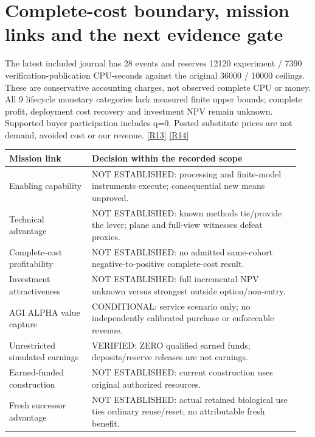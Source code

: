 \documentclass[10pt,letterpaper]{article}
\begin{document}
\section*{Complete-cost boundary, mission links and the next evidence gate}
The latest included journal has 28 events and reserves 12120 experiment / 7390 verification-publication CPU-seconds against the original 36000 / 10000 ceilings. These are conservative accounting charges, not observed complete CPU or money. All 9 lifecycle monetary categories lack measured finite upper bounds; complete profit, deployment cost recovery and investment NPV remain unknown. Supported buyer participation includes q=0. Posted substitute prices are not demand, avoided cost or our revenue. \href{https://github.com/MontrealAI/AGI-Alpha-Invention-Flywheel-Lab/blob/54f229bb0672201dd635a46f8edd71083f1e7bfe/campaign/overnight-008/economics/recovery/run012/CUMULATIVE_COST_RESOURCE.json}{[R13]} \href{https://github.com/MontrealAI/AGI-Alpha-Invention-Flywheel-Lab/blob/54f229bb0672201dd635a46f8edd71083f1e7bfe/campaign/overnight-008/economics/recovery/FINAL_COST_SNAPSHOT_EVENT28.json}{[R14]}\par
\begingroup\small\begin{longtable}{>{\raggedright\arraybackslash}p{0.27\linewidth}>{\raggedright\arraybackslash}p{0.68\linewidth}}\toprule
\textbf{Mission link} & \textbf{Decision within the recorded scope}\\\midrule\endhead
Enabling capability & NOT ESTABLISHED: processing and finite-model instruments execute; consequential new means unproved.\\
Technical advantage & NOT ESTABLISHED: known methods tie/provide the lever; plane and full-view witnesses defeat proxies.\\
Complete-cost profitability & NOT ESTABLISHED: no admitted same-cohort negative-to-positive complete-cost result.\\
Investment attractiveness & NOT ESTABLISHED: full incremental NPV unknown versus strongest outside option/non-entry.\\
AGI ALPHA value capture & CONDITIONAL: service scenario only; no independently calibrated purchase or enforceable revenue.\\
Unrestricted simulated earnings & VERIFIED: ZERO qualified earned funds; deposits/reserve releases are not earnings.\\
Earned-funded construction & NOT ESTABLISHED: current construction uses original authorized resources.\\
Fresh successor advantage & NOT ESTABLISHED: actual retained biological use ties ordinary reuse/reset; no attributable fresh benefit.\\
\bottomrule\end{longtable}\endgroup
\end{document}
